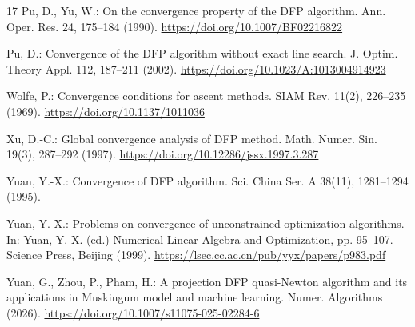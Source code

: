 \documentclass[11pt]{article}
\begin{document}
\begin{thebibliography}{17}
Pu, D., Yu, W.:
On the convergence property of the DFP algorithm.
Ann. Oper. Res. 24, 175--184 (1990).
\url{https://doi.org/10.1007/BF02216822}

Pu, D.:
Convergence of the DFP algorithm without exact line search.
J. Optim. Theory Appl. 112, 187--211 (2002).
\url{https://doi.org/10.1023/A:1013004914923}

Wolfe, P.:
Convergence conditions for ascent methods.
SIAM Rev. 11(2), 226--235 (1969).
\url{https://doi.org/10.1137/1011036}

Xu, D.-C.:
Global convergence analysis of DFP method.
Math. Numer. Sin. 19(3), 287--292 (1997).
\url{https://doi.org/10.12286/jssx.1997.3.287}

Yuan, Y.-X.:
Convergence of DFP algorithm.
Sci. China Ser. A 38(11), 1281--1294 (1995).

Yuan, Y.-X.:
Problems on convergence of unconstrained optimization algorithms.
In: Yuan, Y.-X. (ed.) Numerical Linear Algebra and Optimization,
pp. 95--107. Science Press, Beijing (1999).
\url{https://lsec.cc.ac.cn/pub/yyx/papers/p983.pdf}

Yuan, G., Zhou, P., Pham, H.:
A projection DFP quasi-Newton algorithm and its applications in Muskingum
model and machine learning.
Numer. Algorithms (2026).
\url{https://doi.org/10.1007/s11075-025-02284-6}

\end{thebibliography}
\end{document}
